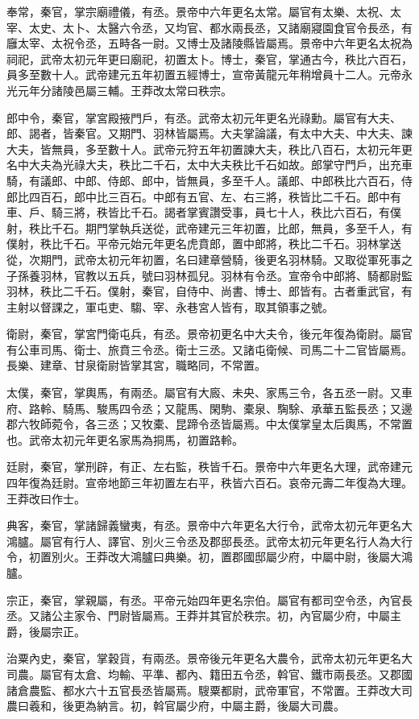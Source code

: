\begin{pinyinscope}
奉常，秦官，掌宗廟禮儀，有丞。景帝中六年更名太常。屬官有太樂、太祝、太宰、太史、太卜、太醫六令丞，又均官、都水兩長丞，又諸廟寢園食官令長丞，有廱太宰、太祝令丞，五畤各一尉。又博士及諸陵縣皆屬焉。景帝中六年更名太祝為祠祀，武帝太初元年更曰廟祀，初置太卜。博士，秦官，掌通古今，秩比六百石，員多至數十人。武帝建元五年初置五經博士，宣帝黃龍元年稍增員十二人。元帝永光元年分諸陵邑屬三輔。王莽改太常曰秩宗。

郎中令，秦官，掌宮殿掖門戶，有丞。武帝太初元年更名光祿勳。屬官有大夫、郎、謁者，皆秦官。又期門、羽林皆屬焉。大夫掌論議，有太中大夫、中大夫、諫大夫，皆無員，多至數十人。武帝元狩五年初置諫大夫，秩比八百石，太初元年更名中大夫為光祿大夫，秩比二千石，太中大夫秩比千石如故。郎掌守門戶，出充車騎，有議郎、中郎、侍郎、郎中，皆無員，多至千人。議郎、中郎秩比六百石，侍郎比四百石，郎中比三百石。中郎有五官、左、右三將，秩皆比二千石。郎中有車、戶、騎三將，秩皆比千石。謁者掌賓讚受事，員七十人，秩比六百石，有僕射，秩比千石。期門掌執兵送從，武帝建元三年初置，比郎，無員，多至千人，有僕射，秩比千石。平帝元始元年更名虎賁郎，置中郎將，秩比二千石。羽林掌送從，次期門，武帝太初元年初置，名曰建章營騎，後更名羽林騎。又取從軍死事之子孫養羽林，官教以五兵，號曰羽林孤兒。羽林有令丞。宣帝令中郎將、騎都尉監羽林，秩比二千石。僕射，秦官，自侍中、尚書、博士、郎皆有。古者重武官，有主射以督課之，軍屯吏、騶、宰、永巷宮人皆有，取其領事之號。

衛尉，秦官，掌宮門衛屯兵，有丞。景帝初更名中大夫令，後元年復為衛尉。屬官有公車司馬、衛士、旅賁三令丞。衛士三丞。又諸屯衛候、司馬二十二官皆屬焉。長樂、建章、甘泉衛尉皆掌其宮，職略同，不常置。

太僕，秦官，掌輿馬，有兩丞。屬官有大廄、未央、家馬三令，各五丞一尉。又車府、路軨、騎馬、駿馬四令丞；又龍馬、閑駒、橐泉、騊駼、承華五監長丞；又邊郡六牧師菀令，各三丞；又牧橐、昆蹄令丞皆屬焉。中太僕掌皇太后輿馬，不常置也。武帝太初元年更名家馬為挏馬，初置路軨。

廷尉，秦官，掌刑辟，有正、左右監，秩皆千石。景帝中六年更名大理，武帝建元四年復為廷尉。宣帝地節三年初置左右平，秩皆六百石。哀帝元壽二年復為大理。王莽改曰作士。

典客，秦官，掌諸歸義蠻夷，有丞。景帝中六年更名大行令，武帝太初元年更名大鴻臚。屬官有行人、譯官、別火三令丞及郡邸長丞。武帝太初元年更名行人為大行令，初置別火。王莽改大鴻臚曰典樂。初，置郡國邸屬少府，中屬中尉，後屬大鴻臚。

宗正，秦官，掌親屬，有丞。平帝元始四年更名宗伯。屬官有都司空令丞，內官長丞。又諸公主家令、門尉皆屬焉。王莽并其官於秩宗。初，內官屬少府，中屬主爵，後屬宗正。

治粟內史，秦官，掌穀貨，有兩丞。景帝後元年更名大農令，武帝太初元年更名大司農。屬官有太倉、均輸、平準、都內、籍田五令丞，斡官、鐵市兩長丞。又郡國諸倉農監、都水六十五官長丞皆屬焉。騪粟都尉，武帝軍官，不常置。王莽改大司農曰羲和，後更為納言。初，斡官屬少府，中屬主爵，後屬大司農。


\end{pinyinscope}
